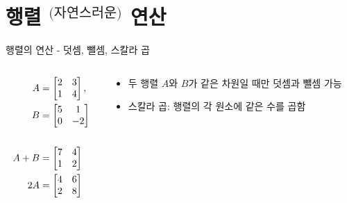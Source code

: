 \documentclass[aspectratio=169]{beamer}
\begin{document}
% 
\section{행렬 $^\text{(자연스러운)}$ 연산 }

\begin{frame}{행렬의 연산 - 덧셈, 뺄셈, 스칼라 곱}
  \begin{columns}
    \begin{column}{0.5\textwidth}
      \begin{align*}
        A &= \begin{bmatrix} 2 & 3 \\ 1 & 4 \end{bmatrix}, \\
        B &= \begin{bmatrix} 5 & 1 \\ 0 & -2 \end{bmatrix} \\
        \vspace{10pt}
        \phantom{blank} \\
        A + B &= \begin{bmatrix} 7 & 4 \\ 1 & 2 \end{bmatrix} \\
        2A &= \begin{bmatrix} 4 & 6 \\ 2 & 8 \end{bmatrix}
      \end{align*}
    \end{column}
    \begin{column}{0.5\textwidth}
      \begin{itemize}
        \item 두 행렬 \( A \)와 \( B \)가 같은 차원일 때만 덧셈과 뺄셈 가능
        \item 스칼라 곱: 행렬의 각 원소에 같은 수를 곱함
      \end{itemize}
    \end{column}
  \end{columns}
\end{frame}
\end{document}
